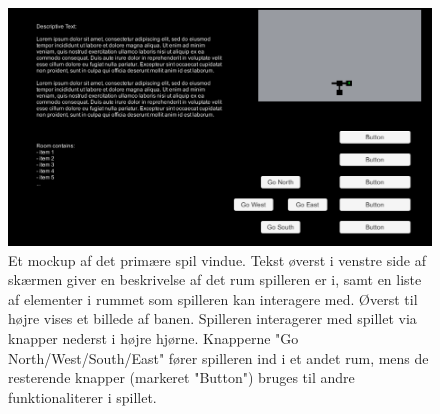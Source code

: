 \begin{figure}[H]
\centering
\includegraphics[width = \textwidth]{02-Body/Images/RoomMockup.PNG}
\caption{Et mockup af det primære spil vindue. Tekst øverst i venstre side af skærmen giver en beskrivelse af det rum spilleren er i, samt en liste af elementer i rummet som spilleren kan interagere med. Øverst til højre vises et billede af banen. Spilleren interagerer med spillet via knapper nederst i højre hjørne. Knapperne "Go {North/West/South/East}" fører spilleren ind i et andet rum, mens de resterende knapper (markeret "Button") bruges til andre funktionaliterer i spillet.}
\label{fig:Design-FE-mockup-room}
\end{figure}

